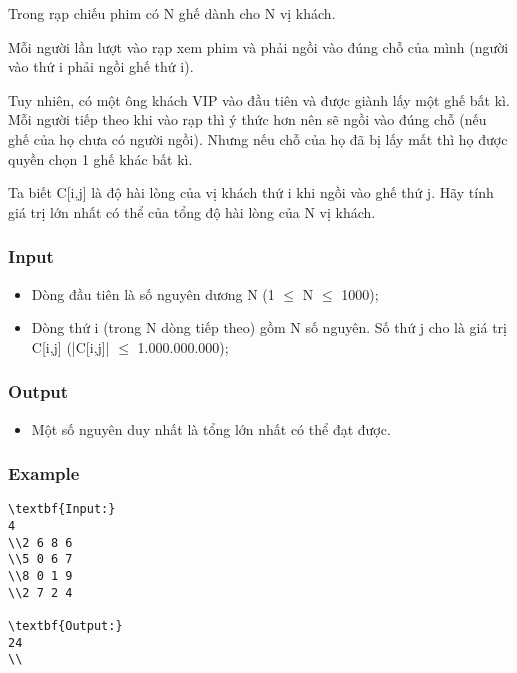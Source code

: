 



   Trong rạp chiếu phim có N ghế dành cho N vị khách.  

   Mỗi người lần lượt vào rạp xem phim và phải ngồi vào đúng chỗ của mình (người vào thứ i phải ngồi ghế thứ i).  

   Tuy nhiên, có một ông khách VIP vào đầu tiên và được giành lấy một ghế bất kì. Mỗi người tiếp theo khi vào rạp thì ý thức hơn nên sẽ ngồi vào đúng chỗ (nếu ghế của họ chưa có người ngồi). Nhưng nếu chỗ của họ đã bị lấy mất thì họ được quyền chọn 1 ghế khác bất kì.  

   Ta biết C[i,j] là độ hài lòng của vị khách thứ i khi ngồi vào ghế thứ j. Hãy tính giá trị lớn nhất có thể của tổng độ hài lòng của N vị khách.  

\subsubsection{   Input  }
\begin{itemize}
	\item     Dòng đầu tiên là số nguyên dương N (1  $\le$  N  $\le$  1000);   
	\item     Dòng thứ i (trong N dòng tiếp theo) gồm N số nguyên. Số thứ j cho là giá trị C[i,j] (|C[i,j]|  $\le$  1.000.000.000);   
\end{itemize}

\subsubsection{   Output  }
\begin{itemize}
	\item     Một số nguyên duy nhất là tổng lớn nhất có thể đạt được.   
\end{itemize}

\subsubsection{   Example  }
\begin{verbatim}
\textbf{Input:}
4
\\2 6 8 6 
\\5 0 6 7 
\\8 0 1 9 
\\2 7 2 4

\textbf{Output:}
24
\\\end{verbatim}
